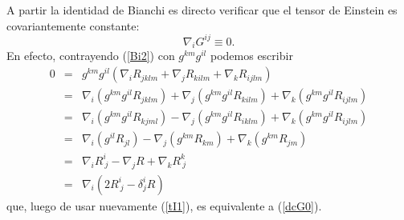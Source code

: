 A partir la identidad de Bianchi es directo verificar que el tensor de Einstein es covariantemente constante:
\begin{equation}
\boxed{\nabla_i G^{ij}\equiv 0.} \label{dcG0}
\end{equation}
En efecto, contrayendo (\ref{Bi2}) con $g^{k m}g^{il}$ podemos escribir
\begin{eqnarray}
0&=&g^{k m}g^{il}\left( \nabla_iR_{jklm}+\nabla_jR_{kil m}+\nabla_kR_{ij
l m}\right) \\
&=&\nabla_i\left(g^{k m}g^{il}R_{jklm}\right)+\nabla_j\left(g^{k m}g^{il}R_{kil m}\right)+\nabla_k\left(g^{k m}g^{il}R_{ijl m}\right) \\
&=&\nabla_i\left(g^{k m}g^{il}R_{kjml}\right)-\nabla_j\left(g^{k m}g^{il}R_{ikl m}\right)+\nabla_k\left(g^{k m}g^{il}R_{ijl m}\right) \\
&=&\nabla_i\left(g^{il}R_{jl}\right)-\nabla_j\left(g^{k m}R_{km}\right)+\nabla_k\left(g^{k m}R_{jm}\right) \\
&=&\nabla_iR^i_{\ j}-\nabla_jR+\nabla_kR^k_{\ j} \\
&=&\nabla_i\left(2R^i_{\ j}-\delta^i_jR\right)
\end{eqnarray}
que, luego de usar nuevamente (\ref{tI1}), es equivalente a (\ref{dcG0}).

